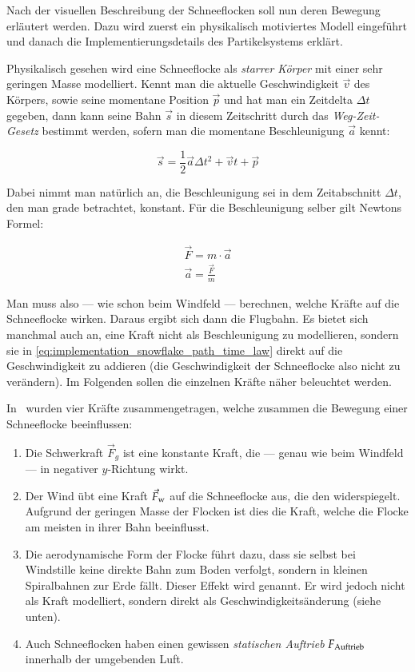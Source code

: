 Nach der visuellen Beschreibung der Schneeflocken soll nun deren
Bewegung erläutert werden. Dazu wird zuerst ein physikalisch
motiviertes Modell eingeführt und danach die Implementierungsdetails
des Partikelsystems erklärt.

Physikalisch gesehen wird eine Schneeflocke als \emph{starrer Körper}
mit einer sehr geringen Masse modelliert. Kennt man die aktuelle
Geschwindigkeit $\vec{v}$ des Körpers, sowie seine momentane Position
$\vec{p}$ und hat man ein Zeitdelta $\Delta t$ gegeben, dann kann
seine Bahn $\vec{s}$ in diesem Zeitschritt durch das
\emph{Weg-Zeit-Gesetz} bestimmt werden, sofern man die momentane
Beschleunigung $\vec{a}$ kennt:

\begin{equation}
\label{eq:implementation_snowflake_path_time_law}
\vec{s} = \frac{1}{2} \vec{a} \Delta t^2 + \vec{v}t + \vec{p}
\end{equation}

Dabei nimmt man natürlich an, die Beschleunigung sei in dem
Zeitabschnitt $\Delta t$, den man grade betrachtet, konstant. Für die
Beschleunigung selber gilt Newtons Formel:

\begin{gather}
\vec{F} = m \cdot \vec{a} \\
\vec{a} = \frac{\vec{F}}{m}
\end{gather}

Man muss also --- wie schon beim Windfeld --- berechnen, welche Kräfte
auf die Schneeflocke wirken. Daraus ergibt sich dann die Flugbahn. Es
bietet sich manchmal auch an, eine Kraft nicht als Beschleunigung zu
modellieren, sondern sie in
\cref{eq:implementation_snowflake_path_time_law} direkt auf die
Geschwindigkeit zu addieren (die Geschwindigkeit der Schneeflocke also
nicht zu verändern). Im Folgenden sollen die einzelnen Kräfte
näher beleuchtet werden.

In~\cite{Aagaard2004} wurden vier Kräfte zusammengetragen, welche
zusammen die Bewegung einer Schneeflocke beeinflussen:

\begin{enumerate}
\item Die Schwerkraft $\vec{F}_g$ ist eine konstante Kraft, die
--- genau wie beim Windfeld --- in negativer $y$-Richtung wirkt.
\item Der Wind übt eine Kraft $\vec{F}_{\textnormal{w}}$
auf die Schneeflocke aus, die den 
widerspiegelt. Aufgrund der geringen Masse der Flocken ist dies die
Kraft, welche die Flocke am meisten in ihrer Bahn beeinflusst.
\item Die aerodynamische Form der Flocke führt dazu, dass sie selbst bei
Windstille keine direkte Bahn zum Boden verfolgt, sondern in kleinen
Spiralbahnen zur Erde fällt. Dieser Effekt wird
 genannt. Er wird jedoch nicht
als Kraft modelliert, sondern direkt als Geschwindigkeitsänderung (siehe unten).
\item Auch Schneeflocken haben einen gewissen \emph{statischen
Auftrieb} $F_{\textnormal{Auftrieb}}$ innerhalb der umgebenden
Luft.
\end{enumerate}

